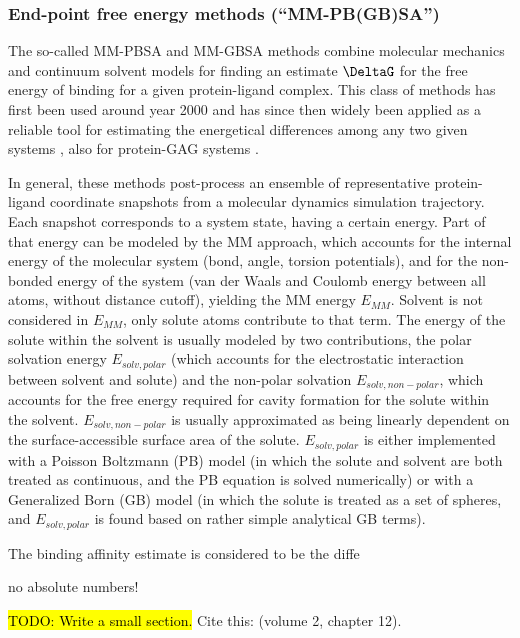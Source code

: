 \subsubsection{End-point free energy methods (\enquote{MM-PB(GB)SA})}
\label{methods:mmpbsa_mmgbsa}

The so-called MM-PBSA and MM-GBSA methods combine molecular mechanics and
continuum solvent models for finding an estimate $\DeltaG$ for the free energy
of binding for a given protein-ligand complex. This class of methods has first
been used around year 2000 \cite{kollmann_massova_mmpbsa_2000} and has since
then widely been applied as a reliable tool for estimating the energetical
differences among any two given systems \cite{mmgbsa_application_2010,
mmpbsa_hiv_2011}, also for protein-GAG systems \cite{mancera_mmpbsa_gags_2009}.

In general, these methods post-process an ensemble of representative
protein-ligand coordinate snapshots from a molecular dynamics simulation
trajectory. Each snapshot corresponds to a system state, having a certain
energy. Part of that energy can be modeled by the MM approach, which accounts
for the internal energy of the molecular system (bond, angle, torsion
potentials), and for the non-bonded energy of the system (van der Waals and
Coulomb energy between all atoms, without distance cutoff), yielding the MM
energy $E_{MM}$. Solvent is not considered in $E_{MM}$, only solute atoms
contribute to that term. The energy of the solute within the solvent is usually
modeled by two contributions, the polar solvation energy $E_{solv,polar}$ (which
accounts for the electrostatic interaction between solvent and solute) and the
non-polar solvation $E_{solv,non-polar}$, which accounts for the free energy
required for cavity formation for the solute within the solvent.
$E_{solv,non-polar}$ is usually approximated as being linearly dependent on the
surface-accessible surface area of the solute. $E_{solv,polar}$ is either
implemented with a Poisson Boltzmann (PB) model (in which the solute and solvent
are both treated as continuous, and the PB equation is solved numerically) or
with a Generalized Born (GB) model (in which the solute is treated as a set of
spheres, and $E_{solv,polar}$ is found based on rather simple analytical GB
terms).




 The binding
affinity estimate is considered to be the diffe


no absolute numbers!



\hl{TODO: Write a small section.}
Cite this: \cite{schlick_innovationsdynamics_2012} (volume 2, chapter 12).
\lipsum[1-5]

